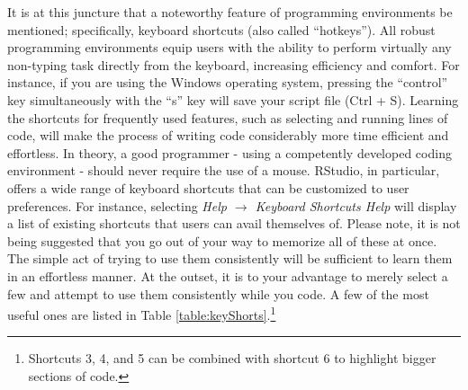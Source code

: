 It is at this juncture that a noteworthy feature of programming environments be mentioned; specifically, keyboard shortcuts (also called ``hotkeys''). All robust programming environments equip users with the ability to perform virtually any non-typing task directly from the keyboard, increasing efficiency and comfort. For instance, if you are using the Windows operating system, pressing the ``control'' key simultaneously with the ``s'' key will save your script file (Ctrl + S). Learning the shortcuts for frequently used features, such as selecting and running lines of code, will make the process of writing code considerably more time efficient and effortless.  In theory, a good programmer - using a competently developed coding environment - should never require the use of a mouse.  RStudio, in particular, offers a wide range of keyboard shortcuts that can be customized to user preferences.  For instance, selecting \textit{Help $\rightarrow$ Keyboard Shortcuts Help} will display a list of existing shortcuts that users can avail themselves of.  Please note, it is not being suggested that you go out of your way to memorize all of these at once. The simple act of trying to use them consistently will be sufficient to learn them in an effortless manner. At the outset, it is to your advantage to merely select a few and attempt to use them consistently while you code. A few of the most useful ones are listed in Table \ref{table:keyShorts}.\footnote{Shortcuts 3, 4, and 5 can be combined with shortcut 6 to highlight bigger sections of code.}

\vspace{1em}



